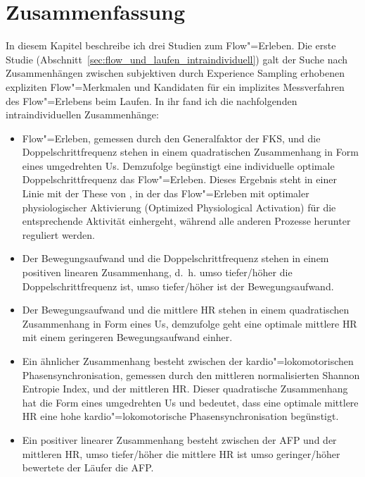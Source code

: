 

\section{Zusammenfassung} \label{sec:zusammenfassung_5}

In diesem Kapitel beschreibe ich drei Studien zum Flow"=Erleben. Die erste Studie (Abschnitt~\ref{sec:flow_und_laufen_intraindividuell}) galt der Suche nach Zusammenhängen zwischen subjektiven durch Experience Sampling erhobenen expliziten Flow"=Merkmalen und Kandidaten für ein implizites Messverfahren des Flow"=Erlebens beim Laufen. In ihr fand ich die nachfolgenden intraindividuellen Zusammenhänge: 
\begin{itemize}
	\item Flow"=Erleben, gemessen durch den Generalfaktor der \ac{FKS}, und die Doppelschrittfrequenz stehen in einem quadratischen Zusammenhang in Form eines umgedrehten Us. Demzufolge begünstigt eine individuelle optimale Doppelschrittfrequenz das Flow"=Erleben. Dieses Ergebnis steht in einer Linie mit der These von \citet[][S.~148]{Peifer2012}, in der das Flow"=Erleben mit optimaler physiologischer Aktivierung (Optimized Physiological Activation) für die entsprechende Aktivität einhergeht, während alle anderen Prozesse herunter reguliert werden.
	
	\item Der Bewegungsaufwand und die Doppelschrittfrequenz stehen in einem positiven linearen Zusammenhang, d.~h. umso tiefer/höher die Doppelschrittfrequenz ist, umso tiefer/höher ist der Bewegungsaufwand.
	
	\item Der Bewegungsaufwand und die mittlere \ac{HR} stehen in einem quadratischen Zusammenhang in Form eines Us, demzufolge geht eine optimale mittlere \ac{HR} mit einem geringeren Bewegungsaufwand einher.
	
	\item Ein ähnlicher Zusammenhang besteht zwischen der kardio"=lokomotorischen Phasensynchronisation, gemessen durch den mittleren normalisierten Shannon Entropie Index, und der mittleren \ac{HR}. Dieser quadratische Zusammenhang hat die Form eines umgedrehten Us und bedeutet, dass eine optimale mittlere \ac{HR} eine hohe kardio"=lokomotorische Phasensynchronisation begünstigt. 
	
	\item Ein positiver linearer Zusammenhang besteht zwischen der \ac{AFP} und der mittleren \ac{HR}, umso tiefer/höher die mittlere \ac{HR} ist umso geringer/höher bewertete der Läufer die \ac{AFP}. 
\end{itemize}

